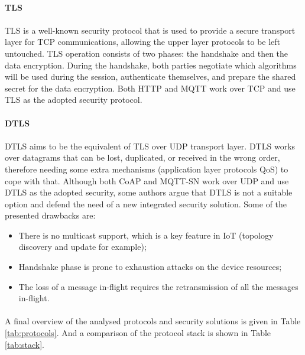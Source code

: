 \paragraph{\textbf{\ac{TLS}}}
\paragraph{}
	\ac{TLS} is a well-known security protocol that is used to provide a secure transport layer for \ac{TCP} communications, allowing the upper layer protocols to be left untouched. \ac{TLS} operation consists of two phases: the handshake and then the data encryption. During the handshake, both parties negotiate which algorithms will be used during the session, authenticate themselves, and prepare the shared secret for the data encryption.
	Both \ac{HTTP} and \ac{MQTT} work over \ac{TCP} and use \ac{TLS} as the adopted security protocol.

\paragraph{\textbf{\ac{DTLS}}}
\paragraph{}
	\ac{DTLS} aims to be the equivalent of \ac{TLS} over \ac{UDP} transport layer. \ac{DTLS} works over datagrams that can be lost, duplicated, or received in the wrong order, therefore needing some extra mechanisms (application layer protocols \ac{QoS}) to cope with that. Although both \ac{CoAP} and \ac{MQTT-SN} work over \ac{UDP} and use \ac{DTLS} as the adopted security, some authors argue that \ac{DTLS} is not a suitable option \cite{Alghamdi2013} and defend the need of a new integrated security solution. Some of the presented drawbacks are:

\begin{itemize}
	\item There is no multicast support, which is a key feature in \ac{IoT} (topology discovery and update for example);\\
	\item Handshake phase is prone to exhaustion attacks on the device resources;\\
	\item The loss of a message in-flight requires the retransmission of all the messages in-flight.
\end{itemize}

\paragraph{}
	A final overview of the analysed protocols and security solutions is given in Table \ref{tab:protocols}. And a comparison of the protocol stack is shown in Table \ref{tab:stack}. 

